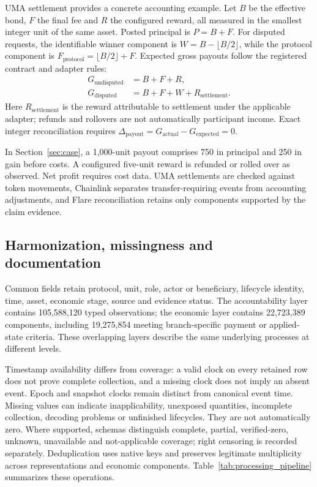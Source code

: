 UMA settlement provides a concrete accounting example. Let $B$ be the effective bond, $F$ the final fee and $R$ the configured reward, all measured in the smallest integer unit of the same asset. Posted principal is $P=B+F$. For disputed requests, the identifiable winner component is $W=B-\lfloor B/2\rfloor$, while the protocol component is $F_{\mathrm{protocol}}=\lfloor B/2\rfloor+F$. Expected gross payouts follow the registered contract and adapter rules:
\begin{align}
 G_{\mathrm{undisputed}} &= B+F+R, \nonumber\\
 G_{\mathrm{disputed}} &= B+F+W+R_{\mathrm{settlement}}.
 \label{eq:payout}
\end{align}
Here $R_{\mathrm{settlement}}$ is the reward attributable to settlement under the applicable adapter; refunds and rollovers are not automatically participant income. Exact integer reconciliation requires $\Delta_{\mathrm{payout}}=G_{\mathrm{actual}}-G_{\mathrm{expected}}=0$.

In Section~\ref{sec:case}, a 1,000-unit payout comprises 750 in principal and 250 in gain before costs. A configured five-unit reward is refunded or rolled over as observed. Net profit requires cost data. UMA settlements are checked against token movements, Chainlink separates transfer-requiring events from accounting adjustments, and Flare reconciliation retains only components supported by the claim evidence.



\subsection{Harmonization, missingness and documentation}

Common fields retain protocol, unit, role, actor or beneficiary, lifecycle identity, time, asset, economic stage, source and evidence status. The accountability layer contains 105,588,120 typed observations; the economic layer contains 22,723,389 components, including 19,275,854 meeting branch-specific payment or applied-state criteria. These overlapping layers describe the same underlying processes at different levels.

Timestamp availability differs from coverage: a valid clock on every retained row does not prove complete collection, and a missing clock does not imply an absent event. Epoch and snapshot clocks remain distinct from canonical event time. Missing values can indicate inapplicability, unexposed quantities, incomplete collection, decoding problems or unfinished lifecycles. They are not automatically zero. Where supported, schemas distinguish complete, partial, verified-zero, unknown, unavailable and not-applicable coverage; right censoring is recorded separately. Deduplication uses native keys and preserves legitimate multiplicity across representations and economic components. Table~\ref{tab:processing_pipeline} summarizes these operations.

